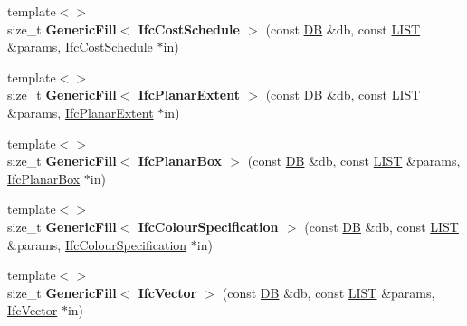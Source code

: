 \begin{DoxyCompactItemize}
\item 
\hypertarget{namespace_assimp_1_1_s_t_e_p_af95b075edc89c0a47841452d8a5a4509}{{\footnotesize template$<$$>$ }\\size\+\_\+t {\bfseries Generic\+Fill$<$ Ifc\+Cost\+Schedule $>$} (const \hyperlink{class_assimp_1_1_s_t_e_p_1_1_d_b}{D\+B} \&db, const \hyperlink{class_assimp_1_1_s_t_e_p_1_1_e_x_p_r_e_s_s_1_1_l_i_s_t}{L\+I\+S\+T} \&params, \hyperlink{struct_assimp_1_1_i_f_c_1_1_ifc_cost_schedule}{Ifc\+Cost\+Schedule} $\ast$in)}\label{namespace_assimp_1_1_s_t_e_p_af95b075edc89c0a47841452d8a5a4509}

\item 
\hypertarget{namespace_assimp_1_1_s_t_e_p_ab37e3801297ff5c160be511844ebee03}{{\footnotesize template$<$$>$ }\\size\+\_\+t {\bfseries Generic\+Fill$<$ Ifc\+Planar\+Extent $>$} (const \hyperlink{class_assimp_1_1_s_t_e_p_1_1_d_b}{D\+B} \&db, const \hyperlink{class_assimp_1_1_s_t_e_p_1_1_e_x_p_r_e_s_s_1_1_l_i_s_t}{L\+I\+S\+T} \&params, \hyperlink{struct_assimp_1_1_i_f_c_1_1_ifc_planar_extent}{Ifc\+Planar\+Extent} $\ast$in)}\label{namespace_assimp_1_1_s_t_e_p_ab37e3801297ff5c160be511844ebee03}

\item 
\hypertarget{namespace_assimp_1_1_s_t_e_p_a9d9df9a70cc2d97f76b1aeaf6851ae86}{{\footnotesize template$<$$>$ }\\size\+\_\+t {\bfseries Generic\+Fill$<$ Ifc\+Planar\+Box $>$} (const \hyperlink{class_assimp_1_1_s_t_e_p_1_1_d_b}{D\+B} \&db, const \hyperlink{class_assimp_1_1_s_t_e_p_1_1_e_x_p_r_e_s_s_1_1_l_i_s_t}{L\+I\+S\+T} \&params, \hyperlink{struct_assimp_1_1_i_f_c_1_1_ifc_planar_box}{Ifc\+Planar\+Box} $\ast$in)}\label{namespace_assimp_1_1_s_t_e_p_a9d9df9a70cc2d97f76b1aeaf6851ae86}

\item 
\hypertarget{namespace_assimp_1_1_s_t_e_p_a5fe63782a92839bdc0478735728ea59c}{{\footnotesize template$<$$>$ }\\size\+\_\+t {\bfseries Generic\+Fill$<$ Ifc\+Colour\+Specification $>$} (const \hyperlink{class_assimp_1_1_s_t_e_p_1_1_d_b}{D\+B} \&db, const \hyperlink{class_assimp_1_1_s_t_e_p_1_1_e_x_p_r_e_s_s_1_1_l_i_s_t}{L\+I\+S\+T} \&params, \hyperlink{struct_assimp_1_1_i_f_c_1_1_ifc_colour_specification}{Ifc\+Colour\+Specification} $\ast$in)}\label{namespace_assimp_1_1_s_t_e_p_a5fe63782a92839bdc0478735728ea59c}

\item 
\hypertarget{namespace_assimp_1_1_s_t_e_p_ad25475586dc8b430d117320ab257b197}{{\footnotesize template$<$$>$ }\\size\+\_\+t {\bfseries Generic\+Fill$<$ Ifc\+Vector $>$} (const \hyperlink{class_assimp_1_1_s_t_e_p_1_1_d_b}{D\+B} \&db, const \hyperlink{class_assimp_1_1_s_t_e_p_1_1_e_x_p_r_e_s_s_1_1_l_i_s_t}{L\+I\+S\+T} \&params, \hyperlink{struct_assimp_1_1_i_f_c_1_1_ifc_vector}{Ifc\+Vector} $\ast$in)}\label{namespace_assimp_1_1_s_t_e_p_ad25475586dc8b430d117320ab257b197}


\end{DoxyCompactItemize}
